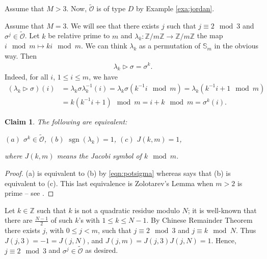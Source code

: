 \documentclass[11pt]{amsart} \textheight 22cm
\renewcommand{\^}[1]{\mbox{$^{\left( #1 \right)}$}}
\renewcommand{\_}[1]{\mbox{$_{\left( #1 \right)}$}}
\newcommand{\trid}{\triangleright}
\newcommand{\Z}{{\mathbb Z}}
\newcommand{\oc}{{\mathcal O}}
\newcommand\sgn{\operatorname{sgn}}
\theoremstyle{plain}
\newtheorem{claim}{Claim}
\theoremstyle{definition}
\theoremstyle{remark}
\newcommand\A{\mathbb A}
\newcommand\s{\mathbb S}
\def\pf{\begin{proof}}
\def\epf{\end{proof}}
\theoremstyle{remark}
\begin{document}
Assume that $M>3$.  Now, $\widetilde{\oc}$ is of type $D$ by
Example \ref{exa:jordan}.


Assume that $M=3$. We will see that there exists $j$ such that
$j\equiv 2 \mod 3$ and $\sigma^j\in \widetilde{\oc}$. Let $k$ be
relative prime to $m$ and $\lambda_k:\Z/m\Z\to \Z/m\Z$ the map $i
\mod m\mapsto ki \mod m$. We can think $\lambda_k$ as a
permutation of $\s_m$ in the obvious way. Then
\begin{align}\label{eqn:potsigma}
\lambda_k\trid \sigma=\sigma^k.
\end{align}
Indeed, for all $i$, $1\leq i\leq m$, we have
\begin{align*}
(\lambda_k\trid \sigma)(i)&=\lambda_k \sigma
\lambda_k^{-1}(i)=\lambda_k \sigma(k^{-1}i \mod m)=\lambda_k
(k^{-1}i+1 \mod m)\\&=k(k^{-1}i+1) \mod m=i+k \mod m=\sigma^k(i).
\end{align*}


\begin{claim}\label{claim:equivalencias}
The following are equivalent:\\
\centerline{$(a)$ $\sigma^k\in\widetilde{\oc}$, \qquad $(b)$
$\sgn(\lambda_k)=1$, \qquad $(c)$ $J(k,m)=1$,} where $J(k,m)$
means the Jacobi symbol of $k \mod m$.
\end{claim}
\pf (a) is equivalent to (b) by \eqref{eqn:potsigma} whereas
\cite[Th. 1]{Sz} says that (b) is equivalent to (c). This last
equivalence is Zolotarev's Lemma when $m>2$ is prime -- see
\cite{Z}.\epf

Let $k\in \Z$ such that $k$ is not a quadratic residue modulo $N$;
it is well-known that there are $\frac{N-1}{2}$ of such $k$'s with
$1\leq k\leq N-1$. By Chinese Remainder Theorem there exists $j$,
with $0\leq j< m$, such that $j \equiv 2 \mod 3$ and $j \equiv k
\mod N$.
Thus $J(j,3)=-1=J(j,N)$, and $J(j,m)=J(j,3)J(j,N)=1$. Hence,
$j\equiv 2 \mod 3$ and $\sigma^j\in \widetilde{\oc}$ as desired.
\end{document}
